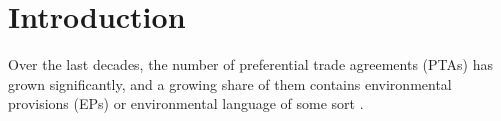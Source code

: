 \documentclass[12pt]{article}
\begin{document}
\begin{abstract}
\end{abstract}

\newpage

\section{Introduction}

Over the last decades, the number of preferential trade agreements (PTAs) has grown significantly, and a growing share of them contains environmental provisions (EPs) or environmental language of some sort \citep{morin2018} \citep{mattoo2020}.
\end{document}
